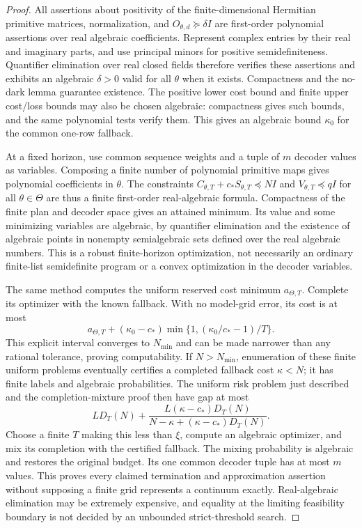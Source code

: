 \begin{proof}
All assertions about positivity of the finite-dimensional Hermitian primitive matrices, normalization, and $O_{\theta,d}\succeq\delta I$ are first-order polynomial assertions over real algebraic coefficients. Represent complex entries by their real and imaginary parts, and use principal minors for positive semidefiniteness. Quantifier elimination over real closed fields \cite{Seidenberg54} therefore verifies these assertions and exhibits an algebraic $\delta>0$ valid for all $\theta$ when it exists. Compactness and the no-dark lemma guarantee existence. The positive lower cost bound and finite upper cost/loss bounds may also be chosen algebraic: compactness gives such bounds, and the same polynomial tests verify them. This gives an algebraic bound $\kappa_0$ for the common one-row fallback.

At a fixed horizon, use common sequence weights and a tuple of $m$ decoder values as variables. Composing a finite number of polynomial primitive maps gives polynomial coefficients in $\theta$. The constraints $C_{\theta,T}+c_*S_{\theta,T}\preccurlyeq NI$ and $V_{\theta,T}\preccurlyeq qI$ for all $\theta\in\Theta$ are thus a finite first-order real-algebraic formula. Compactness of the finite plan and decoder space gives an attained minimum. Its value and some minimizing variables are algebraic, by quantifier elimination and the existence of algebraic points in nonempty semialgebraic sets defined over the real algebraic numbers. This is a robust finite-horizon optimization, not necessarily an ordinary finite-list semidefinite program or a convex optimization in the decoder variables.

The same method computes the uniform reserved cost minimum $a_{\Theta,T}$. Complete its optimizer with the known fallback. With no model-grid error, its cost is at most
\[
 a_{\Theta,T}+(\kappa_0-c_*)
           \min\{1,(\kappa_0/c_*-1)/T\}.
\]
This explicit interval converges to $N_{\min}$ and can be made narrower than any rational tolerance, proving computability. If $N>N_{\min}$, enumeration of these finite uniform problems eventually certifies a completed fallback cost $\kappa<N$; it has finite labels and algebraic probabilities. The uniform risk problem just described and the completion-mixture proof then have gap at most
\[
 LD_T(N)+\frac{L(\kappa-c_*)D_T(N)}{N-\kappa+(\kappa-c_*)D_T(N)}.
\]
Choose a finite $T$ making this less than $\xi$, compute an algebraic optimizer, and mix its completion with the certified fallback. The mixing probability is algebraic and restores the original budget. Its one common decoder tuple has at most $m$ values. This proves every claimed termination and approximation assertion without supposing a finite grid represents a continuum exactly. Real-algebraic elimination may be extremely expensive, and equality at the limiting feasibility boundary is not decided by an unbounded strict-threshold search.
\end{proof}

